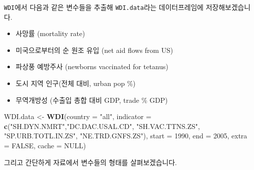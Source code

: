 \documentclass[]{book}
\newenvironment{Shaded}{\begin{snugshade}}{\end{snugshade}}
\newcommand{\CommentTok}[1]{\textcolor[rgb]{0.56,0.35,0.01}{\textit{#1}}}
\newcommand{\DataTypeTok}[1]{\textcolor[rgb]{0.13,0.29,0.53}{#1}}
\newcommand{\DecValTok}[1]{\textcolor[rgb]{0.00,0.00,0.81}{#1}}
\newcommand{\FloatTok}[1]{\textcolor[rgb]{0.00,0.00,0.81}{#1}}
\newcommand{\KeywordTok}[1]{\textcolor[rgb]{0.13,0.29,0.53}{\textbf{#1}}}
\newcommand{\NormalTok}[1]{#1}
\newcommand{\OperatorTok}[1]{\textcolor[rgb]{0.81,0.36,0.00}{\textbf{#1}}}
\newcommand{\OtherTok}[1]{\textcolor[rgb]{0.56,0.35,0.01}{#1}}
\newcommand{\StringTok}[1]{\textcolor[rgb]{0.31,0.60,0.02}{#1}}
\providecommand{\tightlist}{%
  \setlength{\itemsep}{0pt}\setlength{\parskip}{0pt}}
\begin{document}
\texttt{WDI}에서 다음과 같은 변수들을 추출해 \texttt{WDI.data}라는 데이터프레임에 저장해보겠습니다.

\begin{itemize}
\tightlist
\item
  사망률 (mortality rate)
\item
  미국으로부터의 순 원조 유입 (net aid flows from US)
\item
  파상풍 예방주사 (newborns vaccinated for tetanus)
\item
  도시 지역 인구(전체 대비, urban pop \%)
\item
  무역개방성 (수출입 총합 대비 GDP, trade \% GDP)
\end{itemize}

\begin{Shaded}
\begin{Highlighting}[]
\NormalTok{WDI.data <-}\StringTok{  }
\StringTok{  }\KeywordTok{WDI}\NormalTok{(}\DataTypeTok{country =} \StringTok{"all"}\NormalTok{, }
      \DataTypeTok{indicator =} \KeywordTok{c}\NormalTok{(}\StringTok{"SH.DYN.NMRT"}\NormalTok{,}\StringTok{"DC.DAC.USAL.CD"}\NormalTok{, }\StringTok{"SH.VAC.TTNS.ZS"}\NormalTok{,}
                    \StringTok{"SP.URB.TOTL.IN.ZS"}\NormalTok{, }\StringTok{"NE.TRD.GNFS.ZS"}\NormalTok{), }
      \DataTypeTok{start =} \DecValTok{1990}\NormalTok{, }\DataTypeTok{end =} \DecValTok{2005}\NormalTok{, }\DataTypeTok{extra =} \OtherTok{FALSE}\NormalTok{, }\DataTypeTok{cache =} \OtherTok{NULL}\NormalTok{)}
\end{Highlighting}
\end{Shaded}

그리고 간단하게 자료에서 변수들의 형태를 살펴보겠습니다.

\begin{Shaded}
\end{Shaded}
\end{document}
